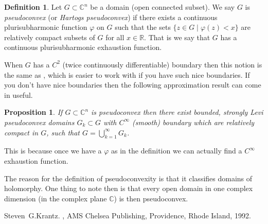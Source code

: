 \documentclass[12pt]{article}
\theoremstyle{theorem}
\newtheorem*{prop}{Proposition}
\theoremstyle{definition}
\newtheorem*{defn}{Definition}
\begin{document}
\begin{defn}
Let $G \subset {\mathbb{C}}^n$ be a domain (open connected subset).
We say $G$ is {\em pseudoconvex} (or {\em Hartogs pseudoconvex}) if there exists a continuous plurisubharmonic function $\varphi$ on $G$ such that
the sets $\{ z \in G \mid \varphi(z) < x \}$ are relatively compact
subsets of $G$ for all $x \in {\mathbb{R}}$.  That is we say that
$G$ has a continuous plurisubharmonic exhaustion function.
\end{defn}

When $G$ has a $C^2$ (twice continuously differentiable) boundary then this
notion is the same as , which
is easier to work with if you have such nice boundaries.  If you don't have
nice boundaries then the following approximation result can come in useful.

\begin{prop}
If $G \subset {\mathbb{C}}^n$ is pseudoconvex then there exist bounded,
strongly Levi pseudoconvex domains $G_k \subset G$ with $C^\infty$ (smooth)
boundary which are relatively compact
in $G$, such that $G = \bigcup_{k=1}^\infty G_k$.
\end{prop}

This is because once we have a $\varphi$ as in the definition we can actually find a $C^\infty$ exhaustion function.

The reason for the definition of pseudoconvexity is that it classifies domains of holomorphy.  One thing to note then is that every open domain in one complex
dimension (in the complex plane ${\mathbb{C}}$) is then pseudoconvex.

\begin{thebibliography}{9}
Steven~G.\@ Krantz.
{\em {}},
AMS Chelsea Publishing, Providence, Rhode Island, 1992.
\end{thebibliography}
\end{document}
